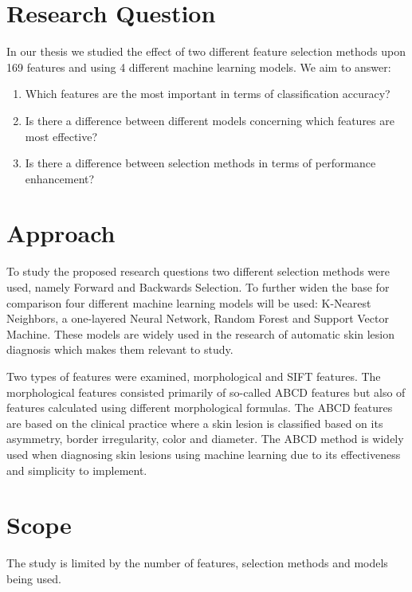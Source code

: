 \documentclass{kththesis}
\begin{document}
\section{Research Question}
In our thesis we studied the effect of two different feature selection methods upon 169 features and using 4 different machine learning models. We aim to answer: %
\begin{enumerate}
    \item Which features are the most important in terms of classification accuracy?
    \item Is there a difference between different models concerning which features are most effective?
    \item Is there a difference between selection methods in terms of performance enhancement?
\end{enumerate}

\section{Approach}

To study the proposed research questions two different selection methods were used, namely Forward and Backwards Selection. To further widen the base for comparison four different machine learning models will be used: K-Nearest Neighbors, a one-layered Neural Network, Random Forest and Support Vector Machine. These models are widely used in the research of automatic skin lesion diagnosis which makes them relevant to study. %

Two types of features were examined, morphological and SIFT features. The morphological features consisted primarily of so-called ABCD features but also of features calculated using different morphological formulas. The ABCD features are based on the clinical practice where a skin lesion is classified based on its asymmetry, border irregularity, color and diameter. The ABCD method is widely used when diagnosing skin lesions using machine learning due to its effectiveness and simplicity to implement. \parencite{JAIN2015735} %

\section{Scope}

The study is limited by the number of features, selection methods and models being used.
\end{document}
